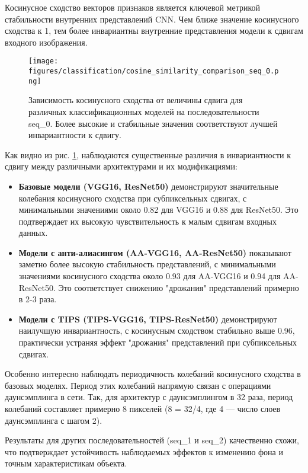 Косинусное сходство векторов признаков является ключевой метрикой стабильности внутренних представлений CNN. Чем ближе значение косинусного сходства к 1, тем более инвариантны внутренние представления модели к сдвигам входного изображения.

\begin{figure}[ht]
\centering
\texttt{[image: figures/classification/cosine\_similarity\_comparison\_seq\_0.png]}
\caption{Зависимость косинусного сходства от величины сдвига для различных классификационных моделей на последовательности seq\_0. Более высокие и стабильные значения соответствуют лучшей инвариантности к сдвигу.}
\label{fig:cosine_similarity_seq_0}
\end{figure}

Как видно из рис. \ref{fig:cosine_similarity_seq_0}, наблюдаются существенные различия в инвариантности к сдвигу между различными архитектурами и их модификациями:

\begin{itemize}
    \item \textbf{Базовые модели (VGG16, ResNet50)} демонстрируют значительные колебания косинусного сходства при субпиксельных сдвигах, с минимальными значениями около 0.82 для VGG16 и 0.88 для ResNet50. Это подтверждает их высокую чувствительность к малым сдвигам входных данных.
    
    \item \textbf{Модели с анти-алиасингом (AA-VGG16, AA-ResNet50)} показывают заметно более высокую стабильность представлений, с минимальными значениями косинусного сходства около 0.93 для AA-VGG16 и 0.94 для AA-ResNet50. Это соответствует снижению "дрожания" представлений примерно в 2-3 раза.
    
    \item \textbf{Модели с TIPS (TIPS-VGG16, TIPS-ResNet50)} демонстрируют наилучшую инвариантность, с косинусным сходством стабильно выше 0.96, практически устраняя эффект "дрожания" представлений при субпиксельных сдвигах.
\end{itemize}

Особенно интересно наблюдать периодичность колебаний косинусного сходства в базовых моделях. Период этих колебаний напрямую связан с операциями даунсэмплинга в сети. Так, для архитектур с даунсэмплингом в 32 раза, период колебаний составляет примерно 8 пикселей (8 = 32/4, где 4 — число слоев даунсэмплинга с шагом 2).

Результаты для других последовательностей (seq\_1 и seq\_2) качественно схожи, что подтверждает устойчивость наблюдаемых эффектов к изменению фона и точным характеристикам объекта.

